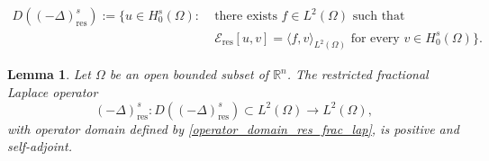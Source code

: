 \documentclass[10pt,a4paper]{amsart}
\newtheorem{lemma}{Lemma}
\begin{document}
\begin{align}\label{operator_domain_res_frac_lap}
D((-\Delta)^s_{\mathrm{res}}):=\big\{u\in H^s_0(\Omega):\;&\text{there exists }f\in L^2(\Omega)
\text{ such that} \nonumber\\
&\mathcal{E}_{\mathrm{res}}[u,v]
 =\langle f,v\rangle_{L^2(\Omega)}
 \text{ for every }v\in H^s_0(\Omega)\big\}.
\end{align}

\begin{lemma}\label{lemma_self_adj_res_frac_Lapl}
Let $\Omega$ be an open bounded subset of $\mathbb{R}^n$. The restricted
fractional Laplace operator
\[
    (-\Delta)^s_{\mathrm{res}}
    :
    D((-\Delta)^s_{\mathrm{res}})\subset L^2(\Omega)
    \longrightarrow L^2(\Omega),
\]
with operator domain defined by
\eqref{operator_domain_res_frac_lap}, is positive and self-adjoint.
\end{lemma}
\end{document}
